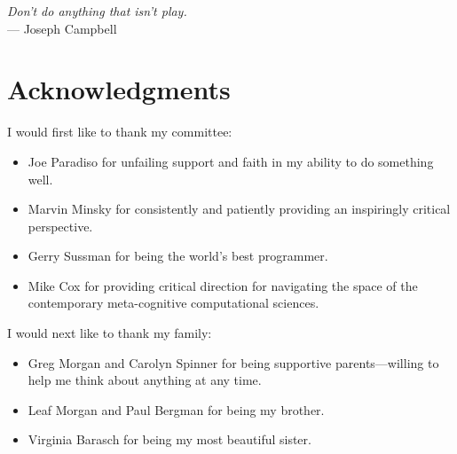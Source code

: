 



\begin{flushright}{\slshape    
Don't do anything that isn't play.} \\ \medskip
    --- Joseph Campbell
\end{flushright}



\bigskip

\begingroup
\let\clearpage\relax
\let\cleardoublepage\relax
\let\cleardoublepage\relax
\chapter*{Acknowledgments}

I would first like to thank my committee:

\begin{itemize}
\item{Joe Paradiso for unfailing support and faith in my ability to do
  something well.}
\item{Marvin Minsky for consistently and patiently providing an
  inspiringly critical perspective.}
\item{Gerry Sussman for being the world's best programmer.}
\item{Mike Cox for providing critical direction for navigating the
  space of the contemporary meta-cognitive computational sciences.}
\end{itemize}

I would next like to thank my family:

\begin{itemize}
\item{Greg Morgan and Carolyn Spinner for being supportive parents---willing to help me think about anything at any time.}
\item{Leaf Morgan and Paul Bergman for being my brother.}
\item{Virginia Barasch for being my most beautiful sister.}
\end{itemize}


\endgroup



